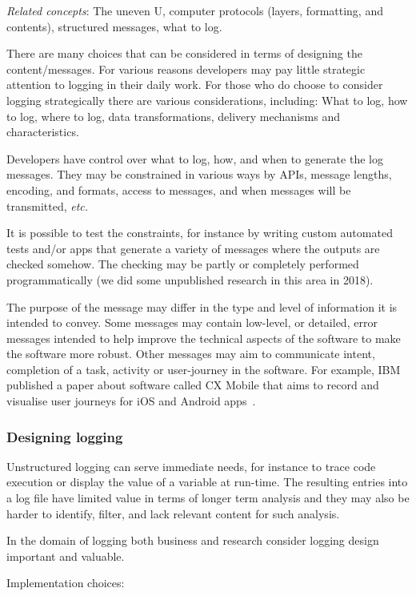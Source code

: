 \emph{Related concepts}: The uneven U, computer protocols (layers, formatting, and contents), structured messages, what to log. %

There are many choices that can be considered in terms of designing the content/messages. For various reasons developers may pay little strategic attention to logging in their daily work. For those who do choose to consider logging strategically there are various considerations, including:
What to log, how to log, where to log, data transformations, delivery mechanisms and characteristics.

Developers have control over what to log, how, and when to generate the log messages. They may be constrained in various ways by APIs, message lengths, encoding, and formats, access to messages, and when messages will be transmitted, \emph{etc.} 

It is possible to test the constraints, for instance by writing custom automated tests and/or apps that generate a variety of messages where the outputs are checked somehow. The checking may be partly or completely performed programmatically (we did some unpublished research in this area in 2018).

The purpose of the message may differ in the type and level of information it is intended to convey. Some messages may contain low-level, or detailed, error messages intended to help improve the technical aspects of the software to make the software more robust. Other messages may aim to communicate intent, completion of a task, activity or user-journey in the software. For example, IBM published a paper about software called CX Mobile that aims to record and visualise user journeys for iOS and Android apps~\cite{hu_tealeaf_cxmobile}.

\subsubsection{Designing logging}
Unstructured logging can serve immediate needs, for instance to trace code execution or display the value of a variable at run-time. The resulting entries into a log file have limited value in terms of longer term analysis and they may also be harder to identify, filter, and lack relevant content for such analysis.

In the domain of logging both business and research consider logging design important and valuable. 

Implementation choices: 

